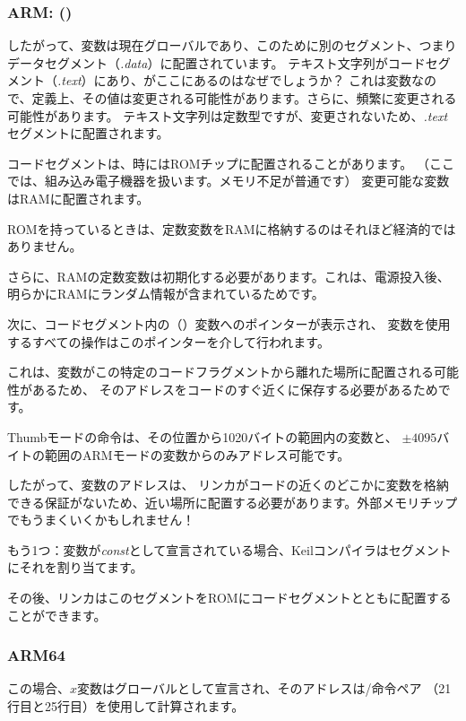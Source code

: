\subsubsection{ARM: \OptimizingKeilVI (\ThumbMode)}



したがって、変数は現在グローバルであり、このために別のセグメント、つまりデータセグメント（\emph{.data}）に配置されています。
テキスト文字列がコードセグメント（\emph{.text}）にあり、がここにあるのはなぜでしょうか？
これは変数なので、定義上、その値は変更される可能性があります。さらに、頻繁に変更される可能性があります。
テキスト文字列は定数型ですが、変更されないため、\emph{.text}セグメントに配置されます。
\myindex{\RAM}
\myindex{\ROM}

コードセグメントは、時には\ac{ROM}チップに配置されることがあります。
（ここでは、組み込み電子機器を扱います。メモリ不足が普通です）
変更可能な変数は\ac{RAM}に配置されます。

ROMを持っているときは、定数変数をRAMに格納するのはそれほど経済的ではありません。

さらに、RAMの定数変数は初期化する必要があります。これは、電源投入後、明らかにRAMにランダム情報が含まれているためです。


次に、コードセグメント内の（）変数へのポインターが表示され、
変数を使用するすべての操作はこのポインターを介して行われます。

これは、変数がこの特定のコードフラグメントから離れた場所に配置される可能性があるため、
そのアドレスをコードのすぐ近くに保存する必要があるためです。

Thumbモードの命令は、その位置から1020バイトの範囲内の変数と、
$\pm{}4095$バイトの範囲のARMモードの変数からのみアドレス可能です。

したがって、変数のアドレスは、
リンカがコードの近くのどこかに変数を格納できる保証がないため、近い場所に配置する必要があります。外部メモリチップでもうまくいくかもしれません！

\myindex{\ROM}

もう1つ：変数が\emph{const}として宣言されている場合、Keilコンパイラはセグメントにそれを割り当てます。

その後、リンカはこのセグメントをROMにコードセグメントとともに配置することができます。

\subsubsection{ARM64}




この場合、$x$変数はグローバルとして宣言され、そのアドレスは/命令ペア
（21行目と25行目）を使用して計算されます。
